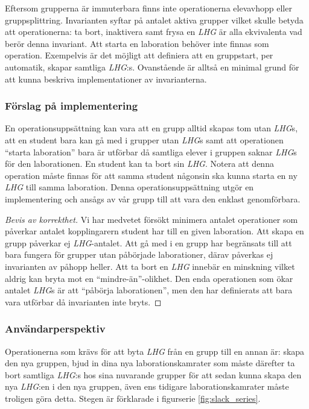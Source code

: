 Eftersom grupperna är immuterbara finns inte operationerna elevavhopp eller gruppsplittring. Invarianten syftar på antalet aktiva grupper vilket skulle betyda att operationerna: ta bort, inaktivera samt frysa en \emph{LHG} är alla ekvivalenta vad berör denna invariant.  Att starta en laboration behöver inte finnas som operation. Exempelvis är det möjligt att definiera att en gruppstart, per automatik, skapar samtliga \emph{LHG}:s. Ovanstående är alltså en minimal grund för att kunna beskriva implementationer av invarianterna.

\subsubsection{Förslag på implementering}
En operationsuppsättning kan vara att en grupp alltid skapas tom utan \emph{LHG}s, att en student bara kan gå med i grupper utan \emph{LHG}s samt att operationen “starta laboration” bara är utförbar då samtliga elever i gruppen saknar \emph{LHG}s för den laborationen. En student kan ta bort sin \emph{LHG}. Notera att denna operation måste finnas för att samma student någonsin ska kunna starta en ny \emph{LHG} till samma laboration. Denna operationsuppsättning utgör en implementering och ansågs av vår grupp till att vara den enklast genomförbara.


\begin{proof}[Bevis av korrekthet]
  Vi har medvetet försökt minimera antalet operationer som påverkar antalet kopplingarern student har till en given laboration. Att skapa en grupp påverkar ej \emph{LHG}-antalet. Att gå med i en grupp har begränsats till att bara fungera för grupper utan påbörjade laborationer, därav påverkas ej invarianten av påhopp heller. Att ta bort en \emph{LHG} innebär en minskning vilket aldrig kan bryta mot en “mindre-än”-olikhet. Den enda operationen som ökar antalet \emph{LHG}s är att “påbörja laborationen”, men den har definierats att bara vara utförbar då invarianten inte bryts. \qedhere
\end{proof}

\subsubsection{Användarperspektiv}
Operationerna som krävs för att byta \emph{LHG} från en grupp till en annan är: skapa den nya gruppen, bjud in dina nya laborationskamrater som måste därefter ta bort samtliga \emph{LHG}:s hos sina nuvarande grupper för att sedan kunna skapa den nya \emph{LHG}:en i den nya gruppen, även ens tidigare laborationskamrater måste troligen göra detta. Stegen är förklarade i  figurserie \ref{fig:slack_series}.

